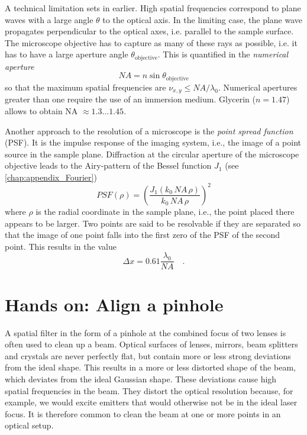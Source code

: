 A technical limitation sets in earlier. High spatial frequencies correspond to plane waves with a large angle $\theta$ to the optical axis. In the limiting case, the plane wave propagates perpendicular to the optical axes, i.e. parallel to the sample surface. The microscope objective has to capture as many of these rays as possible, i.e. it has to have a large aperture angle $\theta_\text{objective}$. This is quantified in the \emph{numerical aperture} 
\begin{equation}
    NA = n \sin \theta_\text{objective}
\end{equation}
so that the maximum spatial frequencies are $\nu_{x,y} \le NA / \lambda_0$. Numerical apertures greater than one require the use of an immersion medium. Glycerin ($n=1.47$) allows to obtain NA $\approx 1.3 \dots 1.45$.

Another approach to the resolution of a microscope is the \emph{point spread function} (PSF). It is the impulse response of the imaging system, i.e., the image of a point source in the sample plane. Diffraction at the circular aperture of the microscope objective leads to the Airy-pattern of the Bessel function $J_1$ (see \ref{chap:appendix_Fourier})
\begin{equation}
    PSF(\rho) = \left( \frac{J_1( k_0 \, {NA} \, \rho )}{ k_0 \, {NA} \, \rho}  \right)^2
\end{equation}
where $\rho$ is the radial coordinate in the sample plane, i.e., the point placed there appears to be larger. Two points are said to be resolvable if they are separated so that the image of one point falls into the first zero of the PSF of the second point. This results in the value 
\begin{equation}
    \Delta x = 0.61 \frac{\lambda_0}{{NA}} \quad .
\end{equation}




\section{Hands on: Align  a pinhole}

A spatial filter in the form of a pinhole at the combined focus of two lenses is often used to clean up a beam. Optical surfaces of lenses, mirrors, beam splitters and crystals are never perfectly flat, but contain more or less strong deviations from the ideal shape. This results in a more or less distorted shape of the beam, which deviates from the ideal Gaussian shape. These deviations cause high spatial frequencies in the beam. They distort the optical resolution because, for example, we would excite emitters that would otherwise not be in the ideal laser focus. It is therefore common to clean the beam at one or more points in an optical setup.

